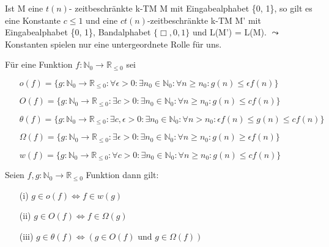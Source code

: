     Ist M eine \(t(n)\)- zeitbeschränkte k-TM M mit Eingabealphabet \{0, 1\}, so gilt es eine Konstante \(c \leq 1\) und eine \(ct(n)\)-zeitbeschränkte k-TM M' mit Eingabealphabet \{0, 1\}, Bandalphabet \(\{\Box, 0, 1\}\) und L(M') = L(M).
    \medskip
    \(\leadsto\) Konstanten spielen nur eine untergeordnete Rolle für uns.

    Für eine Funktion \(f: \mathbb{N}_0 \to \mathbb{R}_{\leq 0}\) sei
    \begin{itemize}
        \item [] \(o(f) = \{g: \mathbb{N}_0 \to \mathbb{R}_{\leq 0} : \forall \epsilon > 0 : \exists n_0 \in \mathbb{N}_0 : \forall n \geq n_0 : g(n) \leq \epsilon f(n)\}\)
        \item [] \(O(f) = \{g: \mathbb{N}_0 \to \mathbb{R}_{\leq 0} : \exists c > 0 : \exists n_0 \in \mathbb{N}_0 : \forall n \geq n_0 : g(n) \leq c f(n)\}\)
        \item [] \(\theta(f) = \{g: \mathbb{N}_0 \to \mathbb{R}_{\leq 0} : \exists c, \epsilon > 0 : \exists n_0 \in \mathbb{N}_0 : \forall n > n_0 : \epsilon f(n) \leq g(n) \leq cf(n)\}\)
        \item [] \(\Omega (f) = \{g: \mathbb{N}_0 \to \mathbb{R}_{\leq 0} : \exists \epsilon > 0 : \exists n_0 \in \mathbb{N}_0 : \forall n \geq n_0 : g(n) \geq \epsilon f(n)\}\)
        \item [] \(w(f) = \{g: \mathbb{N}_0 \to \mathbb{R}_{\leq 0} : \forall c > 0 : \exists n_0 \in \mathbb{N}_0 : \forall n \geq n_0 : g(n) \leq c f(n)\}\)
    \end{itemize}

    Seien \(f, g : \mathbb{N}_0 \to \mathbb{R}_{\leq 0}\) Funktion dann gilt:
    \begin{itemize}
        \item [(i)] \(g \in o(f) \Leftrightarrow f \in w(g)\)
        \item [(ii)] \(g \in O(f) \Leftrightarrow f \in \Omega(g)\)
        \item [(iii)] \(g \in \theta(f) \Leftrightarrow ( g \in O(f) \text{ und }g \in \Omega(f))\)
    \end{itemize}

